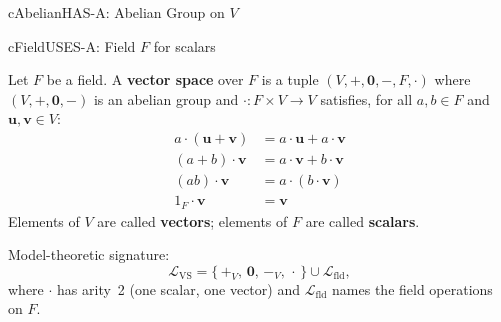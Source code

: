 \noindent
\begin{minipage}[t]{0.485\linewidth}
  \begin{bpinh}{cAbelian}{HAS-A: Abelian Group on $V$}
  \end{bpinh}
\end{minipage}%
\hfill
\begin{minipage}[t]{0.485\linewidth}
  \begin{bpinh}{cField}{USES-A: Field $F$ for scalars}
  \end{bpinh}
\end{minipage}

\begin{definition}
  Let $F$ be a field.  A \textbf{vector space} over $F$ is a tuple
  $(V, +, \mathbf{0}, -, F, \cdot)$ where $(V, +, \mathbf{0}, -)$ is an
  abelian group and $\cdot : F \times V \to V$ satisfies, for all $a, b \in F$
  and $\mathbf{u}, \mathbf{v} \in V$:
  \begin{align*}
    a \cdot (\mathbf{u} + \mathbf{v}) &= a\cdot\mathbf{u} + a\cdot\mathbf{v}
      \tag{Distributivity over vector $+$}\\
    (a + b)\cdot\mathbf{v} &= a\cdot\mathbf{v} + b\cdot\mathbf{v}
      \tag{Distributivity over scalar $+$}\\
    (ab)\cdot\mathbf{v} &= a\cdot(b\cdot\mathbf{v})
      \tag{Compatibility}\\
    1_F\cdot\mathbf{v} &= \mathbf{v}
      \tag{Identity scalar}
  \end{align*}
  Elements of $V$ are called \textbf{vectors}; elements of $F$ are called
  \textbf{scalars}.

  \medskip\noindent
  Model-theoretic signature:
  \[
    \mathcal{L}_{\mathrm{VS}} = \{\,+_V,\,\mathbf{0},\,-_V,\,\cdot\,\}
    \cup \mathcal{L}_{\mathrm{fld}},
  \]
  where $\cdot$ has arity~2 (one scalar, one vector) and
  $\mathcal{L}_{\mathrm{fld}}$ names the field operations on $F$.
\end{definition}

